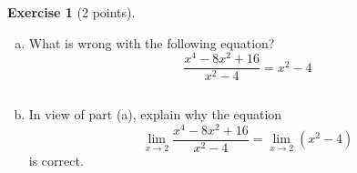 \documentclass[11pt,reqno,final]{amsart}
\numberwithin{equation}{section}
\numberwithin{figure}{section}
\theoremstyle{definition} %
\newtheorem{exercise}[question]{Exercise}
\begin{document}
$ $

\begin{exercise}[2 points]
        $ $
        
        \begin{enumerate}[(a)]
        \item What is wrong with the following equation?
                \[
                        \dfrac{x^4-8x^2+16}{x^2-4} = x^2 - 4
                \]
                
                $ $
        \item In view of part (a), explain why the equation
                \[
                        \displaystyle\lim_{x \to 2}  \dfrac{x^4-8x^2+16}{x^2-4} = \displaystyle \lim_{x \to 2} (x^2 - 4)
                \]
                is correct.
        \end{enumerate}
\end{exercise}
\end{document}

